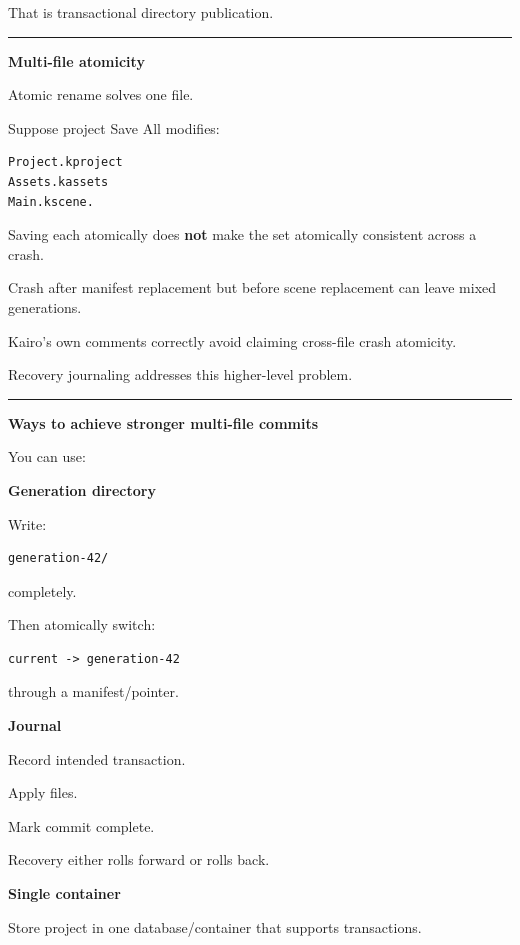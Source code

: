 That is transactional directory publication.

\begin{center}\rule{0.5\linewidth}{0.5pt}\end{center}

\textbf{Multi-file atomicity}

Atomic rename solves one file.

Suppose project Save All modifies:

\begin{verbatim}
Project.kproject
Assets.kassets
Main.kscene.
\end{verbatim}

Saving each atomically does \textbf{not} make the set atomically consistent across a crash.

Crash after manifest replacement but before scene replacement can leave mixed generations.

Kairo's own comments correctly avoid claiming cross-file crash atomicity.

Recovery journaling addresses this higher-level problem.

\begin{center}\rule{0.5\linewidth}{0.5pt}\end{center}

\textbf{Ways to achieve stronger multi-file commits}

You can use:

\textbf{Generation directory}

Write:

\begin{verbatim}
generation-42/
\end{verbatim}

completely.

Then atomically switch:

\begin{verbatim}
current -> generation-42
\end{verbatim}

through a manifest/pointer.

\textbf{Journal}

Record intended transaction.

Apply files.

Mark commit complete.

Recovery either rolls forward or rolls back.

\textbf{Single container}

Store project in one database/container that supports transactions.

